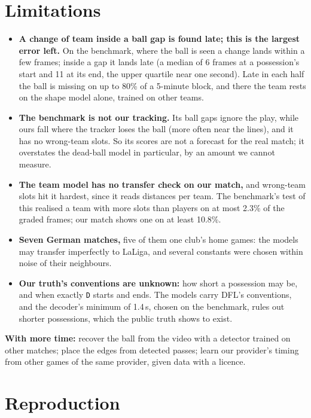 \documentclass[conference,a4paper]{IEEEtran}
\newcommand{\code}[1]{\texttt{#1}}
\begin{document}
\section{Limitations}
\label{sec:limits}

\begin{itemize}
\item \textbf{A change of team inside a ball gap is found late; this is the largest error left.} On the
  benchmark, where the ball is seen a change lands within a few frames; inside a gap it lands late (a median of 6
  frames at a possession's start and 11 at its end, the upper quartile near one second). Late in each half the
  ball is missing on up to 80\% of a 5-minute block, and there the team rests on the shape model alone, trained on
  other teams.
\item \textbf{The benchmark is not our tracking.} Its ball gaps ignore the play, while ours fall where the tracker
  loses the ball (more often near the lines), and it has no wrong-team slots. So its scores are not a forecast
  for the real match; it overstates the dead-ball model in particular, by an amount we cannot measure.
\item \textbf{The team model has no transfer check on our match,} and wrong-team slots hit it hardest, since it
  reads distances per team. The benchmark's test of this realised a team with more slots than players on at most
  2.3\% of the graded frames; our match shows one on at least 10.8\%.
\item \textbf{Seven German matches,} five of them one club's home games: the models may transfer imperfectly to
  LaLiga, and several constants were chosen within noise of their neighbours.
\item \textbf{Our truth's conventions are unknown:} how short a possession may be, and when exactly \code{D}
  starts and ends. The models carry DFL's conventions, and the decoder's minimum of 1.4\,s, chosen on the
  benchmark, rules out shorter possessions, which the public truth shows to exist.
\end{itemize}

\textbf{With more time:} recover the ball from the video with a detector trained on other matches; place the
edges from detected passes; learn our provider's timing from other games of the same provider, given data with a
licence.

\section{Reproduction}
\end{document}
